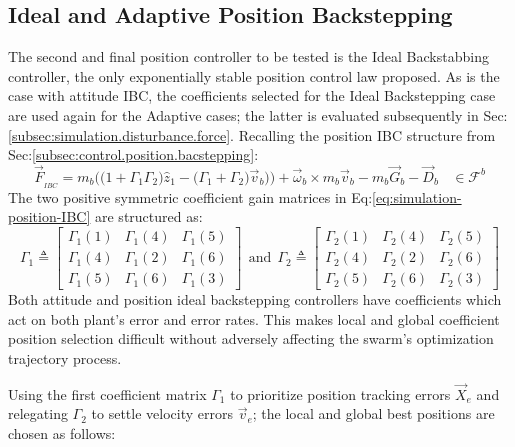 \subsection{Ideal and Adaptive Position Backstepping}
\label{subsec:simulation.position.pd}
The second and final position controller to be tested is the Ideal Backstabbing controller, the only exponentially stable position control law proposed. As is the case with attitude IBC, the coefficients selected for the Ideal Backstepping case are used again for the Adaptive cases; the latter is evaluated subsequently in Sec:\ref{subsec:simulation.disturbance.force}. Recalling the position IBC structure from Sec:\ref{subsec:control.position.bacstepping}:
\begin{equation}\label{eq:simulation-position-IBC}
\vec{F}_{_{IBC}}=m_b\Big(\big(1+\Gamma_1\Gamma_2\big)\hat{z}_1-\big(\Gamma_1+\Gamma_2\big)\vec{v}_b\big)\Big)+\vec{\omega}_b\times m_b\vec{v}_b-m_b\vec{G}_b-\vec{D}_b~~~~\in\mathcal{F}^{b}
\end{equation}
The two positive symmetric coefficient gain matrices in Eq:\ref{eq:simulation-position-IBC} are structured as:
\begin{equation}\label{eq:simulation-position-diagonal-coefficients}
\Gamma_1\triangleq \begin{bmatrix}
\Gamma_1(1) & \Gamma_1(4) & \Gamma_1(5)\\
\Gamma_1(4) & \Gamma_1(2) & \Gamma_1(6)\\
\Gamma_1(5) & \Gamma_1(6) & \Gamma_1(3)
\end{bmatrix}
~~\text{and}~~\Gamma_2\triangleq \begin{bmatrix}
\Gamma_2(1) & \Gamma_2(4) & \Gamma_2(5)\\
\Gamma_2(4) & \Gamma_2(2) & \Gamma_2(6)\\
\Gamma_2(5) & \Gamma_2(6) & \Gamma_2(3)
\end{bmatrix}
\end{equation}
Both attitude and position ideal backstepping controllers have coefficients which act on both plant's error and error rates. This makes local and global coefficient position selection difficult without adversely affecting the swarm's optimization trajectory process. 
\par
Using the first coefficient matrix $\Gamma_1$ to prioritize position tracking errors $\vec{X}_e$ and relegating $\Gamma_2$ to settle velocity errors $\vec{v}_e$; the local and global best positions are chosen as follows:
